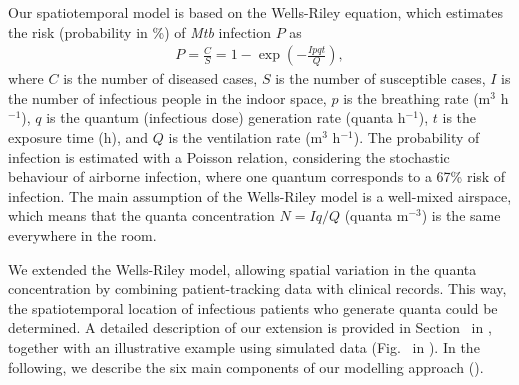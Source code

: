 \documentclass[fleqn,11pt]{wlscirep}
\begin{document}
Our spatiotemporal model is based on the Wells-Riley equation\cite{Riley1961Book}, which estimates the risk (probability in \%) of \emph{Mtb} infection $P$ as
\begin{align}
    P = \frac{C}{S} = 1 - \exp\left(-\frac{Ipqt}{Q}\right),
\end{align}
where $C$ is the number of diseased cases, $S$ is the number of susceptible cases, $I$ is the number of infectious people in the indoor space, $p$ is the breathing rate (m$^3$ h$^{-1}$), $q$ is the quantum (infectious dose) generation rate (quanta h$^{-1}$), $t$ is the exposure time (h), and $Q$ is the ventilation rate (m$^3$ h$^{-1}$). The probability of infection is estimated with a Poisson relation, considering the stochastic behaviour of airborne infection, where one quantum corresponds to a 67\% risk of infection. The main assumption of the Wells-Riley model is a well-mixed airspace, which means that the quanta concentration $N = Iq/Q$ (quanta m$^{-3}$) is the same everywhere in the room. 

We extended the Wells-Riley model, allowing spatial variation in the quanta concentration by combining patient-tracking data with clinical records. This way, the spatiotemporal location of infectious patients who generate quanta could be determined. A detailed description of our extension is provided in Section~ in \supp, together with an illustrative example using simulated data (Fig.~ in \supp). In the following, we describe the six main components of our modelling approach ().
\end{document}
